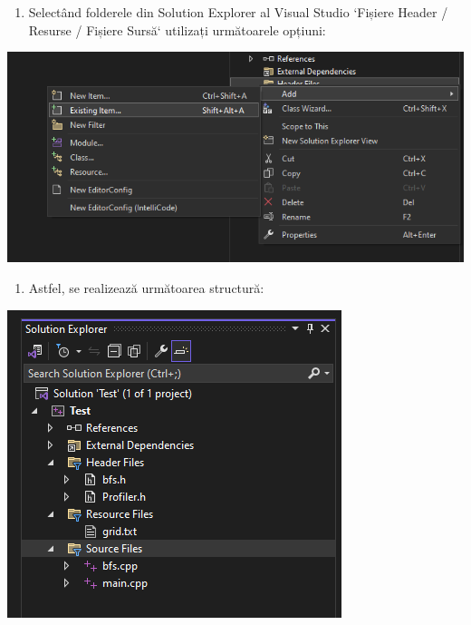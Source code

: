 \documentclass[../ro-fa-lab.tex]{subfiles}
\begin{document}
\begin{enumerate}
\def\labelenumi{\arabic{enumi}.}
\setcounter{enumi}{4}
\item
  Selectând folderele din Solution Explorer al Visual Studio `Fișiere Header / Resurse / Fișiere Sursă` utilizați următoarele opțiuni:
\end{enumerate}

\includegraphics[width=\textwidth,alt={A screenshot of a computer Description automatically generated}]{./Resources/tutorial_lab9/image6.png}

\begin{enumerate}
\def\labelenumi{\arabic{enumi}.}
\setcounter{enumi}{5}
\item
  Astfel, se realizează următoarea structură:
\end{enumerate}

\includegraphics[width=\textwidth,alt={A screenshot of a computer Description automatically generated}]{./Resources/tutorial_lab9/image7.png}
\end{document}
